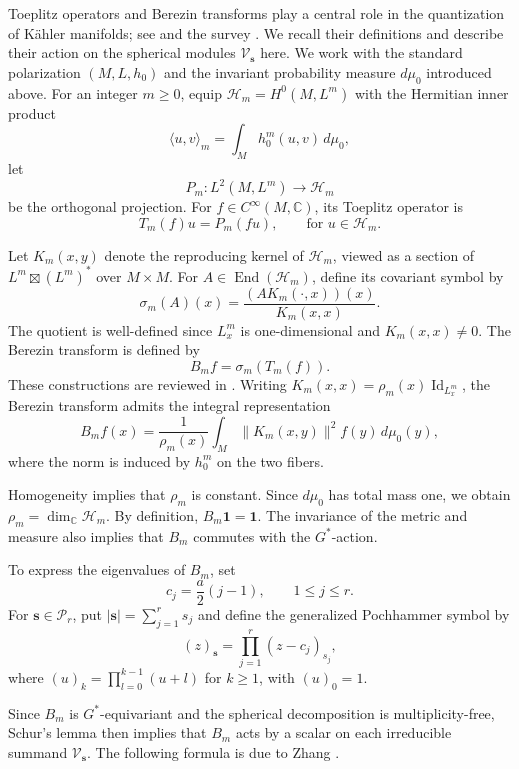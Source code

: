 \documentclass[11pt,reqno]{amsart}
\theoremstyle{corollary}
\theoremstyle{conjecture}
\theoremstyle{assumption}
\theoremstyle{proposition}
\theoremstyle{remark}
\numberwithin{equation}{section}
\begin{document}
Toeplitz operators and Berezin transforms play a central role in the quantization of K\"ahler manifolds; see \cite{Berezin1974,BordemannMeinrenkenSchlichenmaier1994,KarabegovSchlichenmaier2001,MaMarinescu2012} and the survey \cite{Schlichenmaier2010}. We recall their definitions and describe their action on the spherical modules $\mathcal V_{\mathbf s}$ here. We work with the standard polarization $(M,L,h_0)$ and the invariant probability measure $d\mu_0$ introduced above. For an integer $m\geq 0$, equip $\mathcal H_m=H^0(M,L^m)$ with the Hermitian inner product
\[
\langle u,v\rangle_m=\int_M h_0^m(u,v)\,d\mu_0,
\]
let
\[
P_m\colon L^2(M,L^m)\longrightarrow\mathcal H_m
\]
be the orthogonal projection. For $f\in C^\infty(M,\mathbb C)$, its Toeplitz operator is
\[
T_m(f)u=P_m(fu),\qquad \text{for }u\in\mathcal H_m.
\]


Let $K_m(x,y)$ denote the reproducing kernel of $\mathcal H_m$, viewed as a section of $L^m\boxtimes(L^m)^*$ over $M\times M$. For $A\in\operatorname{End}(\mathcal H_m)$, define its covariant symbol by
\[
\sigma_m(A)(x)=\frac{(AK_m(\cdot,x))(x)}{K_m(x,x)}.
\]
The quotient is well-defined since $L_x^m$ is one-dimensional and $K_m(x,x)\neq 0$. The Berezin transform is defined by
\[
B_m f=\sigma_m(T_m(f)).
\]
These constructions are reviewed in \cite[Sections~3, 6, and~7]{Schlichenmaier2010}. Writing $K_m(x,x)=\rho_m(x)\operatorname{Id}_{L_x^m}$, the Berezin transform admits the integral representation
\[
B_m f(x)=\frac{1}{\rho_m(x)}\int_M \|K_m(x,y)\|^2 f(y)\,d\mu_0(y),
\]
where the norm is induced by $h_0^m$ on the two fibers.

Homogeneity implies that $\rho_m$ is constant. Since $d\mu_0$ has total mass one, we obtain $\rho_m=\dim_{\mathbb C}\mathcal H_m$.
By definition, $B_m\mathbf{1}=\mathbf{1}$. The invariance of the metric and measure also implies that $B_m$ commutes with the $G^*$-action.




To express the eigenvalues of $B_m$, set
\[
c_j=\frac a2(j-1),\qquad 1\leq j\leq r.
\]
For $\mathbf s\in\mathcal P_r$, put $|\mathbf s|=\sum_{j=1}^r s_j$ and define the generalized Pochhammer symbol by
\[
(z)_{\mathbf s}=\prod_{j=1}^r(z-c_j)_{s_j},
\]
where $(u)_k=\prod_{l=0}^{k-1}(u+l)$ for $k\geq 1$, with $(u)_0=1$.



Since $B_m$ is $G^*$-equivariant and the spherical decomposition is multiplicity-free, Schur's lemma then implies that $B_m$ acts by a scalar on each irreducible summand $\mathcal V_{\mathbf s}$. The following formula is due to Zhang \cite{Zhang1998}.
\end{document}
